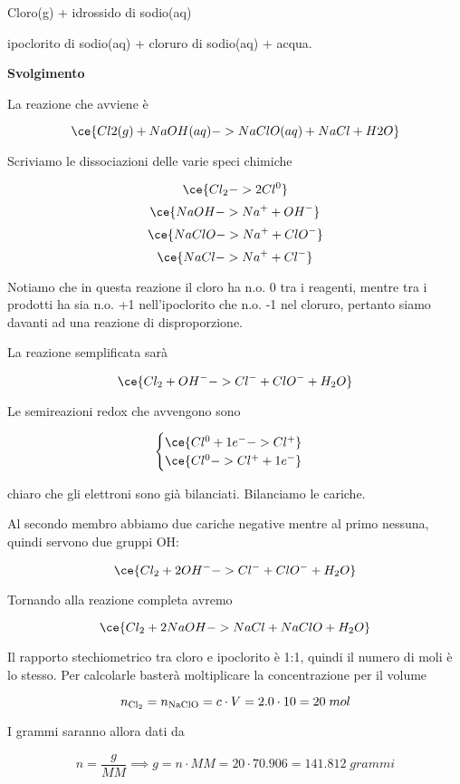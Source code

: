 \begin{center}
    Cloro(g) + idrossido di sodio(aq) \ce{->} 
    
    \ce{->} ipoclorito di sodio(aq) + cloruro di sodio(aq) + acqua. 
\end{center}

\vspace{0.2cm}\large\textbf{Svolgimento}\normalsize

\vspace{0.2cm}La reazione che avviene è

$$\ce{Cl2(g) + NaOH(aq) ->  NaClO(aq) + NaCl + H2O}$$

Scriviamo le dissociazioni delle varie speci chimiche

$$\ce{Cl_2 -> 2Cl^0 }$$
$$\ce{NaOH -> Na^+ + OH^-}$$
$$\ce{NaClO -> Na^+ + ClO^-}$$
$$\ce{NaCl -> Na^+ + Cl^-}$$

Notiamo che in questa reazione il cloro ha n.o. 0 tra i reagenti, mentre tra i prodotti ha sia n.o. +1 nell'ipoclorito che n.o. -1 nel cloruro, pertanto siamo davanti ad una reazione di disproporzione.

La reazione semplificata sarà

$$\ce{Cl_2 + OH^- -> Cl^- + ClO^- + H_2O}$$

Le semireazioni redox che avvengono sono

$$\begin{cases}
    \ce{Cl^{0} + 1e^- -> Cl^+}\\
    \ce{Cl^{0} -> Cl^+ + 1e^-}
\end{cases}$$

\E chiaro che gli elettroni sono già bilanciati. Bilanciamo le cariche.

Al secondo membro abbiamo due cariche negative mentre al primo nessuna, quindi servono due gruppi OH:

$$\ce{Cl_2 + 2OH^- -> Cl^- + ClO^- + H_2O}$$

Tornando alla reazione completa avremo

$$\ce{Cl_2 + 2NaOH -> NaCl + NaClO + H_2O}$$

Il rapporto stechiometrico tra cloro e ipoclorito è 1:1, quindi il numero di moli è lo stesso. Per calcolarle basterà moltiplicare la concentrazione per il volume

$$n_{\rm Cl_2}=n_{\rm NaClO}=c \cdot V=2.0 \cdot 10=20\;mol$$

I grammi saranno allora dati da

$$n=\frac{g}{MM} \implies g=n \cdot MM=20 \cdot 70.906=141.812\;grammi$$

